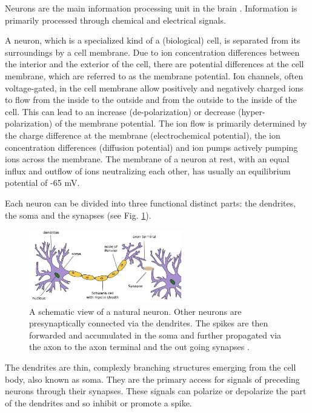 Neurons are the main information processing unit in the brain \cite{Byrne1997, gerstner2014neuronal}. 
Information is primarily processed through chemical and electrical signals.

A neuron, which is a specialized kind of a (biological) cell, is separated from its surroundings by a cell membrane.   
Due to ion concentration differences between the interior and the exterior of the cell, there are potential differences at the cell membrane, which are referred to as the membrane potential. 
Ion channels, often voltage-gated, in the cell membrane allow positively and negatively charged ions to flow from the inside to the outside and from the outside to the inside of the cell.
This can lead to an increase (de-polarization) or decrease (hyper-polarization) of the membrane potential.
The ion flow is primarily determined by the charge difference at the membrane (electrochemical potential), the ion concentration differences (diffusion potential) and ion pumps actively pumping ions across the membrane.
The membrane of a neuron at rest, with an equal influx and outflow of ions neutralizing each other, has usually an equilibrium potential of -65 mV. 

Each neuron can be divided into three functional distinct parts: the dendrites, the soma and the synapses (see Fig. \ref{fig:neuron}).

\begin{figure}[h]
	\centering
    	\includegraphics[width=0.6\textwidth]{imgs/neuron.png} 
    \caption[A schematic view of a natural neuron.]{A schematic view of a natural neuron. Other neurons are presynaptically connected via the dendrites. The spikes are then forwarded and accumulated in the soma and further propagated via the axon to the axon terminal and the out going synapses \cite{neuronImg}.}
	\label{fig:neuron}
\end{figure}

The dendrites are thin, complexly branching structures emerging from the cell body, also known as soma.
They are the primary access for signals of preceding neurons through their synapses. 
These signals can polarize or depolarize the part of the dendrites and so inhibit or promote a spike. 

